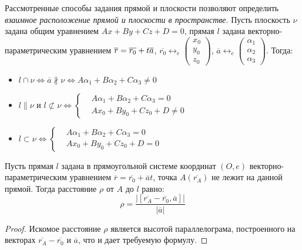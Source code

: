 \begin{note}
	Рассмотренные способы задания прямой и плоскости позволяют определить \textit{взаимное расположение прямой и плоскости в пространстве}. Пусть плоскость $\nu$ задана общим уравнением $Ax + By + Cz + D = 0$, прямая $l$ задана векторно-параметрическим уравнением $\overline{r} \hm{=} \overline{r_0} + t\overline{a}$, $\overline{r_0} \leftrightarrow_{e} \begin{pmatrix}
	x_0\\y_0\\z_0\end{pmatrix}$, $\overline{a} \leftrightarrow_{e} \begin{pmatrix}
	\alpha_1\\\alpha_2\\\alpha_3\end{pmatrix}$. Тогда:
	\begin{itemize}
		\item $l \cap \nu \Leftrightarrow \overline{a} \nparallel \nu \Leftrightarrow A\alpha_1 + B\alpha_2 + C\alpha_3 \ne 0$
		\item $l \parallel \nu \text{ и } l \not\subset \nu \Leftrightarrow
		\left\{\begin{aligned}
		&A\alpha_1 + B\alpha_2 + C\alpha_3 = 0\\
		&Ax_0 + By_0 + Cz_0 + D \ne 0
		\end{aligned}\right.$
		\item $l \subset \nu \Leftrightarrow
		\left\{\begin{aligned}
		&A\alpha_1 + B\alpha_2 + C\alpha_3 = 0\\
		&Ax_0 + By_0 + Cz_0 + D = 0
		\end{aligned}\right.$
	\end{itemize}
\end{note}

\begin{proposition}
	Пусть прямая $l$ задана в прямоугольной системе координат $(O, e)$ векторно-параметрическим уравнением $\overline{r} = \overline{r_0} + \overline{a}t$, точка $A(\overline{r_A})$ не лежит на данной прямой. Тогда расстояние $\rho$ от $A$ до $l$ равно:
	\[\rho = \frac{|[\overline{r_A} - \overline{r_0}, \overline{a}]|}{|\overline{a}|}\]
\end{proposition}

\begin{proof}
	Искомое расстояние $\rho$ является высотой параллелограма, построенного на векторах $\overline{r_A} - \overline{r_0}$ и $\overline{a}$, что и дает требуемую формулу.
\end{proof}


